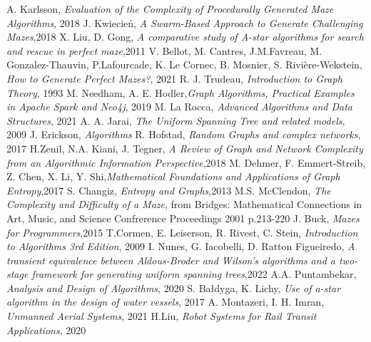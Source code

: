 
\begin{thebibliography}{100}
A. Karlsson, \emph{Evaluation of the Complexity of Procedurally Generated Maze Algorithms}, 2018
J. Kwiecień, \emph{A Swarm-Based Approach to Generate Challenging Mazes},2018
X. Liu, D. Gong, \emph{A comparative study of A-star algorithms for search and rescue in perfect maze},2011
V. Bellot, M. Cantres, J.M.Favreau, M. Gonzalez-Thauvin, P.Lafourcade, K. Le Cornec, B. Mosnier, S. Rivière-Wekstein,
\emph{How to Generate Perfect Mazes?}, 2021
R. J. Trudeau, \emph{Introduction to Graph Theory}, 1993
M. Needham, A. E. Hodler,\emph{Graph Algorithms, Practical Examples in Apache Spark and Neo4j}, 2019
M. La Rocca, \emph{Advanced Algorithms and Data Structures}, 2021 
A. A. Jarai, \emph{The Uniform Spanning Tree and related models}, 2009
 J. Erickson, \emph{Algorithms}
R. Hofstad, \emph{Random Graphs and complex networks}, 2017
H.Zenil, N.A. Kiani, J. Tegner, \emph{A Review of Graph and Network Complexity from an Algorithmic Information Perspective},2018
M. Dehmer, F. Emmert-Streib, Z. Chen, X. Li, Y. Shi,\emph{Mathematical Foundations and Applications of Graph Entropy},2017
S. Changiz, \emph{Entropy and Graphs},2013
M.S. McClendon, \emph{The Complexity and Difficulty of a Maze}, from Bridges: Mathematical Connections in Art, Music, and Science Confrerence Proceedings 2001 p.213-220
J. Buck, \emph{Mazes for Programmers},2015
T.Cormen, E. Leiserson, R. Rivest, C. Stein, \emph{Introduction to Algorithms 3rd Edition}, 2009
I. Nunes, G. Iacobelli, D. Ratton Figueiredo, \emph{A transient equivalence between Aldous-Broder and Wilson's algorithms and a two-stage framework for generating uniform spanning trees},2022
A.A. Puntambekar, \emph{Analysis and Design of Algorithms}, 2020 
S. Bałdyga, K. Lichy, \emph{Use of a-star algorithm in the design of water vessels}, 2017
A. Montazeri, I. H. Imran, \emph{Unmanned Aerial Systems}, 2021
H.Liu, \emph{Robot Systems for Rail Transit Applications}, 2020

\end{thebibliography}
